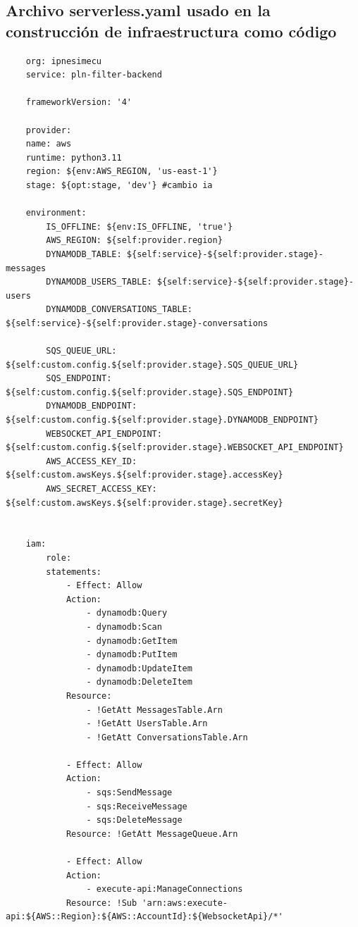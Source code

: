 \subsection{Archivo serverless.yaml usado en la construcción de infraestructura como código}

\begin{lstlisting}
    org: ipnesimecu
    service: pln-filter-backend

    frameworkVersion: '4'

    provider:
    name: aws
    runtime: python3.11
    region: ${env:AWS_REGION, 'us-east-1'}
    stage: ${opt:stage, 'dev'} #cambio ia
    
    environment:
        IS_OFFLINE: ${env:IS_OFFLINE, 'true'}
        AWS_REGION: ${self:provider.region}
        DYNAMODB_TABLE: ${self:service}-${self:provider.stage}-messages
        DYNAMODB_USERS_TABLE: ${self:service}-${self:provider.stage}-users
        DYNAMODB_CONVERSATIONS_TABLE: ${self:service}-${self:provider.stage}-conversations
        
        SQS_QUEUE_URL: ${self:custom.config.${self:provider.stage}.SQS_QUEUE_URL}
        SQS_ENDPOINT: ${self:custom.config.${self:provider.stage}.SQS_ENDPOINT}
        DYNAMODB_ENDPOINT: ${self:custom.config.${self:provider.stage}.DYNAMODB_ENDPOINT}
        WEBSOCKET_API_ENDPOINT: ${self:custom.config.${self:provider.stage}.WEBSOCKET_API_ENDPOINT}
        AWS_ACCESS_KEY_ID: ${self:custom.awsKeys.${self:provider.stage}.accessKey}
        AWS_SECRET_ACCESS_KEY: ${self:custom.awsKeys.${self:provider.stage}.secretKey}

    
    iam:
        role:
        statements:
            - Effect: Allow
            Action:
                - dynamodb:Query
                - dynamodb:Scan
                - dynamodb:GetItem
                - dynamodb:PutItem
                - dynamodb:UpdateItem
                - dynamodb:DeleteItem
            Resource:
                - !GetAtt MessagesTable.Arn
                - !GetAtt UsersTable.Arn
                - !GetAtt ConversationsTable.Arn
            
            - Effect: Allow
            Action:
                - sqs:SendMessage
                - sqs:ReceiveMessage
                - sqs:DeleteMessage
            Resource: !GetAtt MessageQueue.Arn
            
            - Effect: Allow
            Action:
                - execute-api:ManageConnections
            Resource: !Sub 'arn:aws:execute-api:${AWS::Region}:${AWS::AccountId}:${WebsocketApi}/*'


\end{lstlisting}
